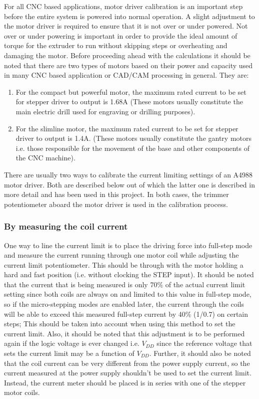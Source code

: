 For all CNC based applications, motor driver calibration is an important step before the entire system is powered into normal operation. A slight adjustment to the motor driver is required to ensure that it is not over or under powered. Not over or under powering is important in order to provide the ideal amount of torque for the extruder to run without skipping steps or overheating and damaging the motor. Before proceeding ahead with the calculations it should be noted that there are two types of motors based on their power and capacity used in many CNC based application or CAD/CAM processing in general. They are:

\begin{enumerate}
 \item For the compact but powerful motor, the maximum rated current to be set for stepper driver to output is 1.68A (These motors usually constitute the main electric drill used for engraving or drilling purposes).
 \item For the slimline motor, the maximum rated current to be set for stepper driver to output is 1.4A. (These motors usually constitute the gantry motors i.e. those responsible for the movement of the base and other components of the CNC machine).
\end{enumerate}

There are usually two ways to calibrate the current limiting settings of an A4988 motor driver. Both are described below out of which the latter one is described in more detail and has been used in this project. In both cases, the trimmer potentiometer aboard the motor driver is used in the calibration process.  \cite{online_calib_guide}

\subsubsection*{By measuring the coil current}

One way to line the current limit is to place the driving force into full-step mode and measure the current running through one motor coil while adjusting the current limit potentiometer. This should be through with the motor holding a hard and fast position (i.e. without clocking the STEP input). It should be noted that the current that is being measured is only 70\% of the actual current limit setting since both coils are always on and limited to this value in full-step mode, so if the micro-stepping modes are enabled later, the current through the coils will be able to exceed this measured full-step current by 40\% (1/0.7) on certain steps; This should be taken into account when using this method to set the current limit. Also, it should be noted that this adjustment is to be performed again if the logic voltage is ever changed i.e. $V_{DD}$ since the reference voltage that sets the current limit may be a function of $V_{DD}$. Further, it should also be noted that the coil current can be very different from the power supply current, so the current measured at the power supply shouldn’t be used to set the current limit. Instead, the current meter should be placed is in series with one of the stepper motor coils.

